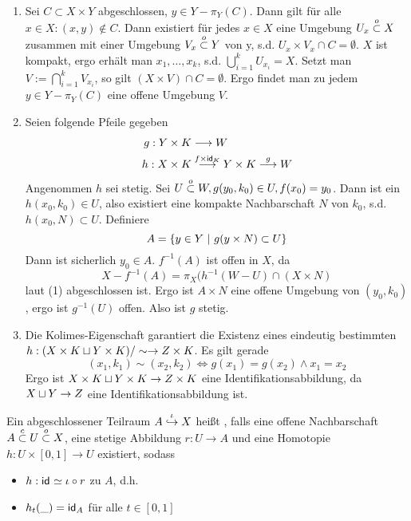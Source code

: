\begin{Beweis}
\ 
\begin{enumerate}
\item Sei $C \subset X \times Y$ abgeschlossen, $y \in Y - \pi_Y(C)$. Dann gilt für alle $x \in X: (x,y) \notin C$. Dann existiert für jedes $x \in X$ eine Umgebung $U_x\overset{o}{\subset} X$ zusammen mit einer Umgebung $V_x \overset{o}{\subset} Y$ von y, s.d. $U_x \times V_x \cap C = \emptyset$. $X$ ist kompakt, ergo erhält man $x_1,\ldots, x_k$, s.d. $\bigcup^k_{i = 1} U_{x_i} = X$. Setzt man $V := \bigcap_{i = 1}^k V_{x_i}$, so gilt $(X\times V)\cap C = \emptyset$. Ergo findet man zu jedem $y \in Y - \pi_Y(C)$ eine offene Umgebung $V$.

\item Seien folgende Pfeile gegeben
\begin{align*}
g : Y \times K & \longrightarrow W\\
h : X \times K & \overset{f\times \textsf{id}_{K}}{\longrightarrow} Y \times K \overset{g}{\longrightarrow} W 
\end{align*}
Angenommen $h$ sei stetig. Sei $U\overset{o}{\subset} W, g(y_0, k_0) \in U, f(x_0) = y_0$. Dann ist ein $h(x_0, k_0) \in U$, also existiert eine kompakte Nachbarschaft $N$ von $k_0$, s.d. $h(x_0, N) \subset U$. Definiere
\[A = \left\lbrace y \in Y~|~g(y \times N) \subset U  \right\rbrace\]
Dann ist sicherlich $y_0 \in A$. $f^{-1}(A)$ ist offen in $X$, da
\[X - f^{-1}(A) = \pi_X(h^{-1}(W-U) \cap (X \times N)\]
laut (1) abgeschlossen ist. Ergo ist $A \times N$ eine offene Umgebung von $(y_0, k_0)$, ergo ist $g^{-1}(U)$ offen. Also ist $g$ stetig.

\item Die Kolimes-Eigenschaft garantiert die Existenz eines eindeutig bestimmten $h : (X\times K \sqcup Y \times K)/\sim \overset{}{\rightarrow} Z \times K$. Es gilt gerade 
\[(x_1, k_1) \sim (x_2, k_2) \Longleftrightarrow g(x_1) = g(x_2) \wedge x_1 = x_2 \]
Ergo ist $X \times K \sqcup Y \times K \overset{}{\rightarrow} Z \times K$ eine Identifikationsabbildung, da $X\sqcup Y \overset{}{\rightarrow} Z$ eine Identifikationsabbildung ist.
\end{enumerate}
\end{Beweis}


Ein abgeschlossener Teilraum $A \overset{\iota}{\hookrightarrow} X$ heißt , falls eine offene Nachbarschaft $A \overset{c}{\subset} U \overset{o}{\subset} X$, eine stetige Abbildung $r:U \rightarrow A $ und eine Homotopie$h : U \times [0,1] \rightarrow U$ existiert, sodass
\begin{itemize}
\item $h: \textsf{id}_{} \simeq \iota \circ r $  zu $A$, d.h.
\item $h_t(\_) = \textsf{id}_{A}$ für alle $t \in [0,1]$
\end{itemize}

